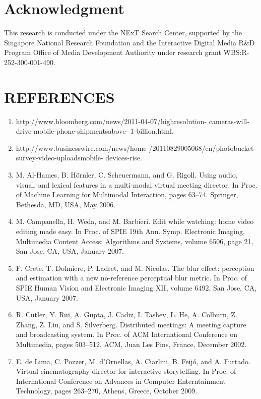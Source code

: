 \documentclass{sig-alternate}
\begin{document}
{{{\section*{Acknowledgment}
This research is conducted under the NExT Search Center, supported
by the Singapore National Research Foundation and the Interactive
Digital Media R&D Program Office of Media Development
Authority under research grant WBS:R-252-300-001-490.

\section{REFERENCES}

\begin{enumerate}
    \item http://www.bloomberg.com/news/2011-04-07/highresolution-
cameras-will-drive-mobile-phone-shipmentsabove-
1-billion.html.
   \item http://www.businesswire.com/news/home
/20110829005068/en/photobucket-survey-video-uploadsmobile-
devices-rise.
   \item M. Al-Hames, B. Hörnler, C. Scheuermann, and G. Rigoll.
Using audio, visual, and lexical features in a multi-modal
virtual meeting director. In Proc. of Machine Learning for
Multimodal Interaction, pages 63–74. Springer, Bethesda,
MD, USA, May 2006.
   \item M. Campanella, H. Weda, and M. Barbieri. Edit while
watching: home video editing made easy. In Proc. of SPIE
19th Ann. Symp. Electronic Imaging, Multimedia Content
Access: Algorithms and Systems, volume 6506, page 21, San
Jose, CA, USA, January 2007.
   \item F. Crete, T. Dolmiere, P. Ladret, and M. Nicolas. The blur
effect: perception and estimation with a new no-reference
perceptual blur metric. In Proc. of SPIE Human Vision and
Electronic Imaging XII, volume 6492, San Jose, CA, USA,
January 2007.
   \item R. Cutler, Y. Rui, A. Gupta, J. Cadiz, I. Tashev, L. He,
A. Colburn, Z. Zhang, Z. Liu, and S. Silverberg. Distributed
meetings: A meeting capture and broadcasting system. In
Proc. of ACM International Conference on Multimedia,
pages 503–512. ACM, Juan Les Pins, France, December
2002.
    \item E. de Lima, C. Pozzer, M. d’Ornellas, A. Ciarlini, B. Feijó,
and A. Furtado. Virtual cinematography director for
interactive storytelling. In Proc. of International Conference
on Advances in Computer Enterntainment Technology, pages
263–270, Athens, Greece, October 2009.

\end{enumerate}}}}
\end{document}

